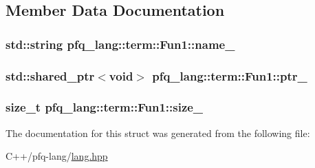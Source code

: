 \subsection{Member Data Documentation}
\hypertarget{structpfq__lang_1_1term_1_1Fun1_a5ae8141faf641ceecf3f9903495b29d9}{
\subsubsection[{name\+\_\+}]{\setlength{\rightskip}{0pt plus 5cm}std\+::string pfq\+\_\+lang\+::term\+::\+Fun1\+::name\+\_\+}}\label{structpfq__lang_1_1term_1_1Fun1_a5ae8141faf641ceecf3f9903495b29d9}
\hypertarget{structpfq__lang_1_1term_1_1Fun1_a150724b8abe6251cfe55c5b1c41db965}{
\subsubsection[{ptr\+\_\+}]{\setlength{\rightskip}{0pt plus 5cm}std\+::shared\+\_\+ptr$<$void$>$ pfq\+\_\+lang\+::term\+::\+Fun1\+::ptr\+\_\+}}\label{structpfq__lang_1_1term_1_1Fun1_a150724b8abe6251cfe55c5b1c41db965}
\hypertarget{structpfq__lang_1_1term_1_1Fun1_afabaf60d8bf22076984a9105b64c1139}{
\subsubsection[{size\+\_\+}]{\setlength{\rightskip}{0pt plus 5cm}size\+\_\+t pfq\+\_\+lang\+::term\+::\+Fun1\+::size\+\_\+}}\label{structpfq__lang_1_1term_1_1Fun1_afabaf60d8bf22076984a9105b64c1139}


The documentation for this struct was generated from the following file\+:\begin{DoxyCompactItemize}
\item 
C++/pfq-\/lang/\hyperlink{lang_8hpp}{lang.\+hpp}\end{DoxyCompactItemize}
